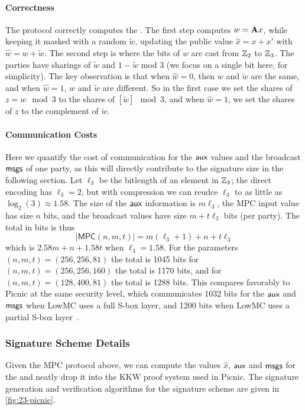 \paragraph{Correctness} The protocol correctly computes the \ttOWF.  The
first step computes $w = \mathbf{A} x$, while keeping it masked with a random $\tilde{w}$,
updating the public value $\hat{x} = x + x'$ with $\hat{w} = w + \tilde{w}$.  The
second step is where the bits of $w$ are cast from $\mathbb{Z}_2$ to $\mathbb{Z}_3$.  The 
parties have sharings of $\tilde{w}$ and $1-\tilde{w}$ mod 3 (we focus on a single bit here, for simplicity). The key observation is
that when $\hat{w} = 0$, then $w$ and $\tilde{w}$ are the same, and when $\hat{w} =
1$, $w$ and $\tilde{w}$ are different. So in the first case we set the shares of $ z =
w \mod 3$ to the shares of $[\tilde{w}] \mod 3$, and when $\hat{w} = 1$, we set the
shares of $z$ to the complement of $\tilde{w}$.

\paragraph{Communication Costs}
Here we quantify the cost of communication for the $\textsf{aux}$ values and the broadcast $\textsf{msgs}$ of one party,
as this will directly contribute to the signature size in the following section. 
Let $\ell_3$ be the bitlength of an element in $\mathbb{Z}_3$; the direct encoding has
$\ell_3 = 2$, but with compression we can reudce $\ell_3$ to as little as
$\log_2(3) \approx 1.58$.    The size of the
$\textsf{aux}$ information is $m\ell_3$, the MPC input value has size $n$ bits, 
and the broadcast values have size $m + t\ell_3$ bits (per party). 
The total in bits is thus 
\begin{equation} \label{eqn:sizeMPC}
|\textsf{MPC}(n,m,t)| = m(\ell_3 + 1) + n + t\ell_3 
\end{equation}
which is $2.58m + n + 1.58t$ when $\ell_3 = 1.58$. 
For the parameters $(n,m,t) = (256, 256, 81)$ the total is 1045 bits for
$(n,m,t) = (256, 256, 160)$ the total is 1170 bits, and for
$(n,m,t)=(128, 400, 81)$ the total is 1288 bits.  This compares favorably to
Picnic at the same security level, which communicates 1032 bits for the $\textsf{aux}$
and $\textsf{msgs}$ when LowMC uses a full S-box layer, and 1200 bits when LowMC
uses a partial S-box layer~\cite{TCHES:KalZav20}. 

\subsubsection{Signature Scheme Details}
Given the MPC protocol above, we can compute the values $\hat{x}$, $\textsf{aux}$ and
$\textsf{msgs}$ for the \ttOWF and neatly drop it into the KKW proof system used in
Picnic.  The signature generation and verification algorithms for the
\ttOWF  signature scheme are given in \cref{fig:23-picnic}.

